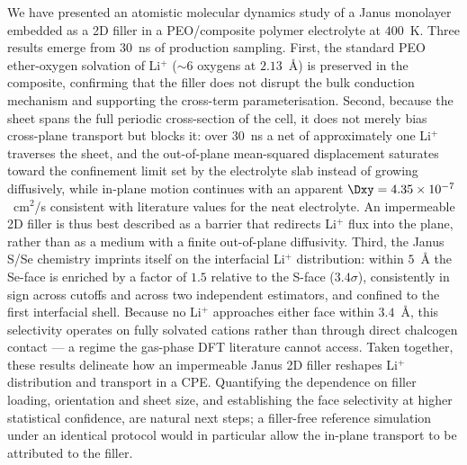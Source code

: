 We have presented an atomistic molecular dynamics study of a Janus \WSSe monolayer embedded as a 2D filler in a PEO/\LiTFSI composite polymer electrolyte at $400$~K. Three results emerge from $30$~ns of production sampling. First, the standard PEO ether-oxygen solvation of Li$^+$ ($\sim6$ oxygens at $2.13$~\AA) is preserved in the composite, confirming that the filler does not disrupt the bulk conduction mechanism and supporting the cross-term parameterisation. Second, because the sheet spans the full periodic cross-section of the cell, it does not merely bias cross-plane transport but blocks it: over $30$~ns a net of approximately one Li$^+$ traverses the sheet, and the out-of-plane mean-squared displacement saturates toward the confinement limit set by the electrolyte slab instead of growing diffusively, while in-plane motion continues with an apparent $\Dxy = 4.35 \times 10^{-7}$~cm$^2$/s consistent with literature values for the neat electrolyte. An impermeable 2D filler is thus best described as a barrier that redirects Li$^+$ flux into the plane, rather than as a medium with a finite out-of-plane diffusivity. Third, the Janus S/Se chemistry imprints itself on the interfacial Li$^+$ distribution: within $5$~\AA{} the Se-face is enriched by a factor of $1.5$ relative to the S-face ($3.4\sigma$), consistently in sign across cutoffs and across two independent estimators, and confined to the first interfacial shell. Because no Li$^+$ approaches either face within $3.4$~\AA, this selectivity operates on fully solvated cations rather than through direct chalcogen contact --- a regime the gas-phase DFT literature cannot access. Taken together, these results delineate how an impermeable Janus 2D filler reshapes Li$^+$ distribution and transport in a CPE. Quantifying the dependence on filler loading, orientation and sheet size, and establishing the face selectivity at higher statistical confidence, are natural next steps; a filler-free reference simulation under an identical protocol would in particular allow the in-plane transport to be attributed to the filler.
